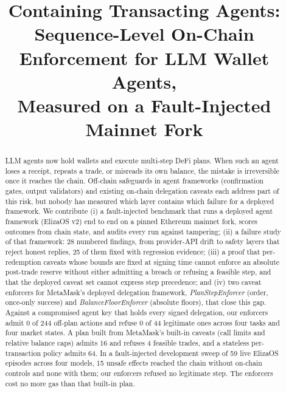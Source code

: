 \documentclass[conference]{IEEEtran}
\begin{document}
\title{Containing Transacting Agents:\\Sequence-Level On-Chain Enforcement for LLM Wallet Agents,\\Measured on a Fault-Injected Mainnet Fork}

\author{
}

\maketitle

\begin{abstract}
LLM agents now hold wallets and execute multi-step DeFi plans. When such an agent loses a receipt, repeats a
trade, or misreads its own balance, the mistake is irreversible once it reaches the chain. Off-chain safeguards in
agent frameworks (confirmation gates, output validators) and existing on-chain delegation caveats each address
part of this risk, but nobody has measured which layer contains which failure for a deployed framework. We contribute (i) a
fault-injected benchmark that runs a deployed agent framework (ElizaOS v2) end to end on a pinned Ethereum mainnet
fork, scores outcomes from chain state, and audits every run against tampering; (ii) a failure study of that
framework: 28 numbered findings, from provider-API drift to safety layers that reject honest replies, 25 of them fixed
with regression evidence; (iii) a proof that per-redemption caveats whose bounds are fixed at signing time cannot
enforce an absolute post-trade reserve without either admitting a breach or refusing a feasible step, and that the
deployed caveat set cannot express step precedence; and (iv) two caveat enforcers for MetaMask's deployed
delegation framework, \emph{PlanStepEnforcer} (order, once-only success) and \emph{BalanceFloorEnforcer} (absolute
floors), that close this gap. Against a compromised agent key that holds every signed delegation, our enforcers
admit 0 of 244 off-plan actions and refuse 0 of 44 legitimate ones across four tasks and four market states. A plan
built from MetaMask's built-in caveats (call limits and relative balance caps) admits 16 and refuses 4 feasible trades, and a stateless
per-transaction policy admits 64.
In a fault-injected development sweep of 59 live ElizaOS episodes across four models, 15 unsafe effects reached the
chain without on-chain controls and none with them; our enforcers refused no legitimate step. The enforcers cost no
more gas than that built-in plan.
\end{abstract}
\end{document}
